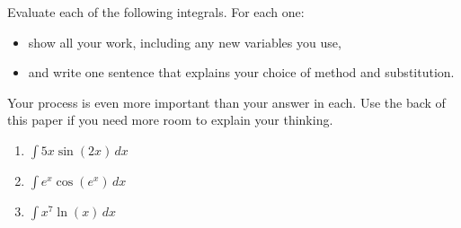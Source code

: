 \hrulefill

Evaluate each of the following integrals. For each one:
\begin{itemize}
	\item show all your work, including any new variables you use,
	\item and write one sentence that explains your choice of method and substitution.
\end{itemize}
Your process is even more important than your answer in each. Use the back of this paper if you need more room to explain your thinking.

\begin{enumerate}
	\item $\int 5x \sin(2x) \, dx$
			
	\vfill

	\item $\int e^x \cos(e^x) \, dx$

	\vfill

	\item $\int x^7 \ln(x) \, dx$
	\vfill
\end{enumerate}

